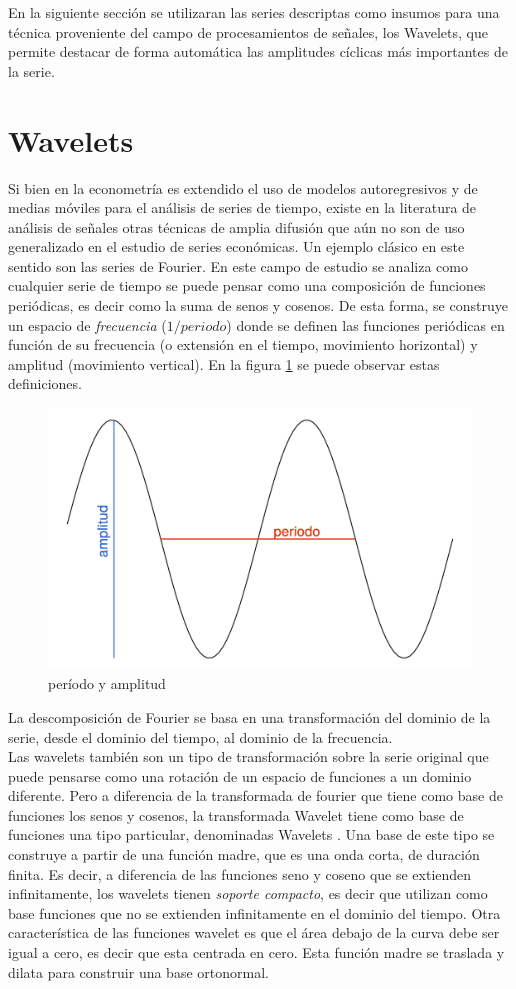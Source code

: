 \documentclass[a4paper]{article}
\begin{document}
En la siguiente sección se utilizaran las series descriptas como insumos para una técnica proveniente del campo de procesamientos de señales, los Wavelets, que permite destacar de forma automática las amplitudes cíclicas más importantes de la serie.

\section{Wavelets}

Si bien en la econometría es extendido el uso de modelos autoregresivos y de medias móviles para el análisis de series de tiempo, existe en la literatura de análisis de señales otras técnicas de amplia difusión que aún no son de uso generalizado en el estudio de series económicas. Un ejemplo clásico en este sentido son las series de Fourier. En este campo de estudio se analiza como cualquier serie de tiempo se puede pensar como una composición de funciones periódicas, es decir como la suma de senos y cosenos. De esta forma, se construye un espacio de \textit{frecuencia} ($1/periodo$) donde se definen las funciones periódicas en función de su frecuencia (o extensión en el tiempo, movimiento horizontal) y amplitud (movimiento vertical). En la figura \ref{fig:ciclo} se puede observar estas definiciones.

\begin{figure}[H]
	\centering
	\includegraphics[width=0.65\linewidth]{ciclo.png}
	\caption{período y amplitud} \label{fig:ciclo}
\end{figure}

La descomposición de Fourier se basa en una transformación del dominio de la serie, desde el dominio del tiempo, al dominio de la frecuencia.\\

Las wavelets también son un tipo de transformación sobre la serie original que puede pensarse como una rotación de un espacio de funciones a un dominio diferente. Pero a diferencia de la transformada de fourier que tiene como base de funciones los senos y cosenos, la transformada Wavelet tiene como base de funciones una tipo particular, denominadas Wavelets \cite{castro1995wavelets}. Una base de este tipo se construye a partir de una función madre, que es una onda corta, de duración finita. Es decir, a diferencia de las funciones seno y coseno que se extienden infinitamente, los wavelets tienen \textit{soporte compacto}, es decir que utilizan como base funciones que no se extienden infinitamente en el dominio del tiempo. Otra característica de las funciones wavelet es que el área debajo de la curva debe ser igual a cero, es decir que esta centrada en cero. Esta función madre se traslada y dilata para construir una base ortonormal. 
\end{document}

